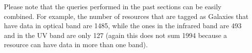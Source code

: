 Please note that the queries performed in the past sections can be easily combined. For example,
the number of resources that are tagged as Galaxies that have data in optical band are 1485, while the ones in
the infrared band are 493 and in the UV band are only 127 (again this does not sum 1994 because a resource can have data
in more than one band). 



%

